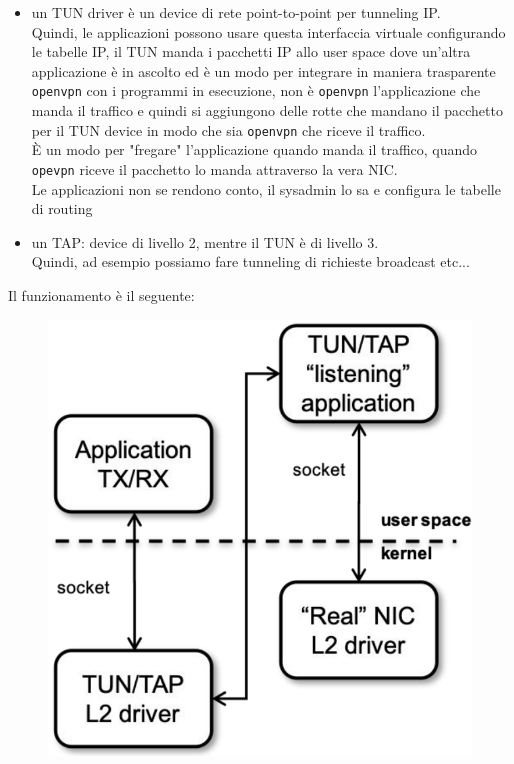 \documentclass[12pt, oneside]{extbook} %
\begin{document}
\begin{itemize}
    \item un TUN driver è un device di rete point-to-point per tunneling IP.
    \\Quindi, le applicazioni possono usare questa interfaccia virtuale configurando le tabelle IP, il TUN manda i pacchetti IP allo user space dove un'altra applicazione è in ascolto ed è un modo per integrare in maniera trasparente \texttt{openvpn} con i programmi in esecuzione, non è \texttt{openvpn} l'applicazione che manda il traffico e quindi si aggiungono delle rotte che mandano il pacchetto per il TUN device in modo che sia \texttt{openvpn} che riceve il traffico.
    \\È un modo per "fregare" l'applicazione quando manda il traffico, quando \texttt{opevpn} riceve il pacchetto lo manda attraverso la vera NIC.
    \\Le applicazioni non se rendono conto, il sysadmin lo sa e configura le tabelle di routing
    \item un TAP: device di livello 2, mentre il TUN è di livello 3.
    \\Quindi, ad esempio possiamo fare tunneling di richieste broadcast etc...
\end{itemize}
Il funzionamento è il seguente:
\begin{figure}[h!]
    \centering
    \includegraphics[scale=0.5]{../../immagini/tun_tap}
\end{figure}\\\\
\end{document}
